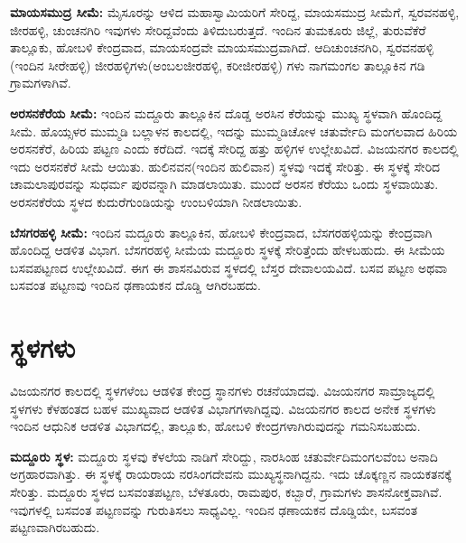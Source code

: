 \textbf{ಮಾಯಸಮುದ್ರ ಸೀಮೆ:} ಮೈಸೂರನ್ನು ಆಳಿದ ಮಹಾಸ್ವಾಮಿಯರಿಗೆ ಸೇರಿದ್ದ, ಮಾಯಸಮುದ್ರ ಸೀಮೆಗೆ, ಸ್ವರವನಹಳ್ಳಿ, ಜೀರಹಳ್ಳಿ, ಚುಂಚನಗಿರಿ ಇವುಗಳು ಸೇರಿದ್ದವೆಂದು ತಿಳಿದುಬರುತ್ತದೆ. ಇಂದಿನ ತುಮಕೂರು ಜಿಲ್ಲೆ, ತುರುವೆಕೆರೆ ತಾಲ್ಲೂಕು, ಹೋಬಳಿ ಕೇಂದ್ರವಾದ, ಮಾಯಸಂದ್ರವೇ ಮಾಯಸಮುದ್ರವಾಗಿದೆ. ಆದಿಚುಂಚನಗಿರಿ, ಸ್ವರವನಹಳ್ಳಿ (ಇಂದಿನ ಸೀರೇಹಳ್ಳಿ) ಜೀರಹಳ್ಳಿಗಳು(ಅಂಬಲಜೀರಹಳ್ಳಿ, ಕರೀಜೀರಹಳ್ಳಿ) ಗಳು ನಾಗಮಂಗಲ ತಾಲ್ಲೂಕಿನ ಗಡಿ ಗ್ರಾಮಗಳಾಗಿವೆ.

\textbf{ಅರಸನಕೆರೆಯ ಸೀಮೆ:} ಇಂದಿನ ಮದ್ದೂರು ತಾಲ್ಲೂಕಿನ ದೊಡ್ಡ ಅರಸಿನ ಕೆರೆಯನ್ನು ಮುಖ್ಯ ಸ್ಥಳವಾಗಿ ಹೊಂದಿದ್ದ ಸೀಮೆ. ಹೊಯ್ಸಳರ ಮುಮ್ಮಡಿ ಬಲ್ಲಾಳನ ಕಾಲದಲ್ಲಿ, ಇದನ್ನು ಮುಮ್ಮಡಿಚೋಳ ಚತುರ್ವೇದಿ ಮಂಗಲವಾದ ಹಿರಿಯ ಅರಸನಕೆರೆ, ಹಿರಿಯ ಪಟ್ಟಣ ಎಂದು ಕರೆದಿದೆ. ಇದಕ್ಕೆ ಸೇರಿದ್ದ ಹತ್ತು ಹಳ್ಳಿಗಳ ಉಲ್ಲೇಖವಿದೆ. ವಿಜಯನಗರ ಕಾಲದಲ್ಲಿ ಇದು ಅರಸನಕೆರೆ ಸೀಮೆ ಆಯಿತು. ಹುಲಿನವನ(ಇಂದಿನ ಹುಲಿವಾನ) ಸ್ಥಳವು ಇದಕ್ಕೆ ಸೇರಿತ್ತು. ಈ ಸ್ಥಳಕ್ಕೆ ಸೇರಿದ ಚಾಮಲಾಪುರವನ್ನು ಸುಧರ್ಮ ಪುರವನ್ನಾಗಿ ಮಾಡಲಾಯಿತು. ಮುಂದೆ ಅರಸನ ಕೆರೆಯು ಒಂದು ಸ್ಥಳವಾಯಿತು. ಅರಸನಕೆರೆಯ ಸ್ಥಳದ ಕುದುರೆಗುಂಡಿಯನ್ನು ಉಂಬಳಿಯಾಗಿ ನೀಡಲಾಯಿತು.

\textbf{ಬೆಸಗರಹಳ್ಳಿ ಸೀಮೆ:} ಇಂದಿನ ಮದ್ದೂರು ತಾಲ್ಲೂಕಿನ, ಹೋಬಳಿ ಕೇಂದ್ರವಾದ, ಬೆಸಗರಹಳ್ಳಿಯನ್ನು ಕೇಂದ್ರವಾಗಿ ಹೊಂದಿದ್ದ ಆಡಳಿತ ವಿಭಾಗ. ಬೆಸಗರಹಳ್ಳಿ ಸೀಮೆಯ ಮದ್ದೂರು ಸ್ಥಳಕ್ಕೆ ಸೇರಿತ್ತೆಂದು ಹೇಳಬಹುದು. ಈ ಸೀಮೆಯ ಬಸವಪಟ್ಟಣದ ಉಲ್ಲೇಖವಿದೆ. ಈಗ ಈ ಶಾಸನವಿರುವ ಸ್ಥಳದಲ್ಲಿ ಬೆಸ್ತರ ದೇವಾಲಯವಿದೆ. ಬಸವ ಪಟ್ಟಣ ಅಥವಾ ಬಸವಂತ ಪಟ್ಟಣವು ಇಂದಿನ ಢಣಾಯಕನ ದೊಡ್ಡಿ ಆಗಿರಬಹದು.

\section{ಸ್ಥಳಗಳು}

ವಿಜಯನಗರ ಕಾಲದಲ್ಲಿ ಸ್ಥಳಗಳೆಂಬ ಆಡಳಿತ ಕೇಂದ್ರ ಸ್ಥಾನಗಳು ರಚನೆಯಾದವು. ವಿಜಯನಗರ ಸಾಮ್ರಾಜ್ಯದಲ್ಲಿ ಸ್ಥಳಗಳು ಕೆಳಹಂತದ ಬಹಳ ಮುಖ್ಯವಾದ ಆಡಳಿತ ವಿಭಾಗಗಳಾಗಿದ್ದವು. ವಿಜಯನಗರ ಕಾಲದ ಅನೇಕ ಸ್ಥಳಗಳು ಇಂದಿನ ಆಧುನಿಕ ಆಡಳಿತ ವಿಭಾಗದಲ್ಲಿ, ತಾಲ್ಲೂಕು, ಹೋಬಳಿ ಕೇಂದ್ರಗಳಾಗಿರುವುದನ್ನು ಗಮನಿಸಬಹುದು.

\textbf{ಮದ್ದೂರು ಸ್ಥಳ:} ಮದ್ದೂರು ಸ್ಥಳವು ಕೆಳಲೆಯ ನಾಡಿಗೆ ಸೇರಿದ್ದು, ನಾರಸಿಂಹ ಚತುರ್ವೇದಿಮಂಗಲವೆಂಬ ಅನಾದಿ ಅಗ್ರಹಾರವಾಗಿತ್ತು. ಈ ಸ್ಥಳಕ್ಕೆ ರಾಯರಾಯ ನರಸಿಂಗದೇವನು ಮುಖ್ಯಸ್ಥನಾಗಿದ್ದನು. ಇದು ಚೊಕ್ಕಣ್ಣನ ನಾಯಕತನಕ್ಕೆ ಸೇರಿತ್ತು. ಮದ್ದೂರು ಸ್ಥಳದ ಬಸವಂತಪಟ್ಟಣ, ಬೆಳತೂರು, ರಾಮಪುರ, ಕಬ್ಬಾರೆ, ಗ್ರಾಮಗಳು ಶಾಸನೋಕ್ತವಾಗಿವೆ. ಇವುಗಳಲ್ಲಿ ಬಸವಂತ ಪಟ್ಟಣವನ್ನು ಗುರುತಿಸಲು ಸಾಧ್ಯವಿಲ್ಲ. ಇಂದಿನ ಢಣಾಯಕನ ದೊಡ್ಡಿಯೇ, ಬಸವಂತ ಪಟ್ಟಣವಾಗಿರಬಹುದು.

